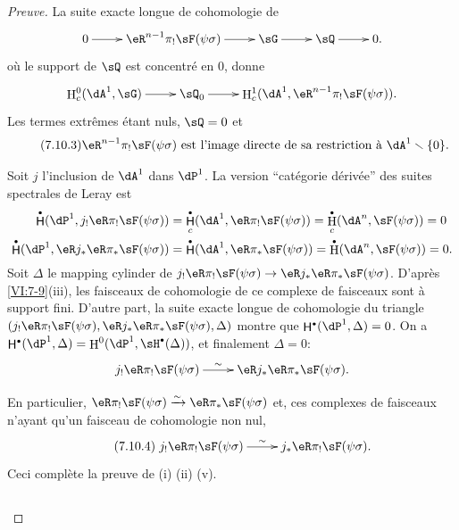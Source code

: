 \documentclass[oneside]{book}
\DeclareMathOperator{\h}{H}
\DeclareMathOperator{\hh}{\mathsf{H}} %
\newcommand{\iso}{\xrightarrow\sim}
\renewcommand{\setminus}{\smallsetminus}
\theoremstyle{sga-source}
\theoremstyle{sga-source-dash}
\theoremstyle{sga-source-dotdash}
\theoremstyle{sga-source-number-note-dash}
\theoremstyle{sga-source-note-number-dotdash}
\theoremstyle{sga-source-example-dotdash}
\theoremstyle{sga-source-inline-number}
\theoremstyle{sga-source-bare-number}
\theoremstyle{sga-source}
\let\oldbullet\bullet
\renewcommand{\bullet}{\textnormal{\tiny$\oldbullet$}}
\newcommand{\PrintPage}[1]{}\newcommand{\MathPage}[1]{}\newcommand{\PrintCite}[2]{#1}\newcommand{\var}[3]{#2}
\begin{document}
\begin{proof}[Preuve]
\PrintPage{223}
La suite exacte longue de cohomologie de 
\[\xymatrix{
  0 \ar[r] 
    & \eR^{n-1} \pi_! \sF(\psi\sigma) \ar[r] 
    & \sG \ar[r] 
    & \sQ \ar[r] 
    & 0 \text{.} 
}\]
où le support de $\sQ$ est concentré en $0$, donne 
\[\xymatrix{
  \h_c^0(\dA^1,\sG) \ar[r] 
    & \sQ_0 \ar[r] 
    & \h_c^1(\dA^1,\eR^{n-1} \pi_! \sF(\psi\sigma)) \text{.} 
}\]
Les termes extrêmes étant nuls, $\sQ=0$ et 
\begin{equation*}\tag{7.10.3}\label{VI:eq:7-10-3}
  \text{$\eR^{n-1} \pi_! \sF(\psi\sigma)$ est l'image directe de sa restriction à $\dA^1\setminus \{0\}$.}
\end{equation*}

Soit $j$ l'inclusion de $\dA^1$ dans $\dP^1$. La version ``catégorie 
dérivée'' des suites spectrales de Leray est 
\begin{align*}
  \hh^\bullet(\dP^1,j_! \eR\pi_! \sF(\psi\sigma)) &= \hh_c^\bullet(\dA^1,\eR \pi_! \sF(\psi\sigma)) = \h_c^\bullet(\dA^n,\sF(\psi\sigma)) = 0 \\
  \hh^\bullet(\dP^1,\eR j_\ast \eR \pi_\ast \sF(\psi\sigma)) &= \hh^\bullet(\dA^1,\eR \pi_\ast \sF(\psi\sigma)) = \h^\bullet(\dA^n,\sF(\psi\sigma)) = 0 \text{.}
\end{align*}
Soit $\Delta$ le mapping cylinder de 
$j_! \eR\pi_! \sF(\psi\sigma) \to \eR j_\ast \eR \pi_\ast \sF(\psi\sigma)$. 
D'après \ref{VI:7-9}(iii), les faisceaux de cohomologie de ce complexe de 
faisceaux sont à support fini. D'autre part, la suite exacte longue de 
cohomologie du triangle 
$(j_!\eR \pi_! \sF(\psi\sigma),\eR j_\ast \eR \pi_\ast \sF(\psi\sigma),\Delta)$ 
montre que $\hh^\bullet(\dP^1,\Delta)=0$. On a 
$\hh^\bullet(\dP^1,\Delta) = \h^0(\dP^1,\sH^\bullet(\Delta))$, et finalement 
$\Delta=0$: 
\[\xymatrix{
  j_! \eR\pi_! \sF(\psi\sigma) \ar[r]^-\sim 
    & \eR j_\ast \eR \pi_\ast \sF(\psi\sigma) \text{.} 
}\]

En particulier, $\eR\pi_! \sF(\psi\sigma)\iso \eR\pi_\ast \sF(\psi\sigma)$ et, 
ces complexes de faisceaux n'ayant qu'un faisceau de cohomologie non nul, 
\begin{equation*}\tag{7.10.4}\label{VI:eq:7-10-4}
\xymatrix{
  j_! \eR \pi_! \sF(\psi\sigma) \ar[r]^-\sim 
    & j_\ast \eR \pi_! \sF(\psi\sigma) \text{.} 
}
\end{equation*}
Ceci complète la preuve de (i) (ii) (v). 





\PrintPage{224}
\subsection{}\label{VI:7-11}


\end{proof}
\end{document}

